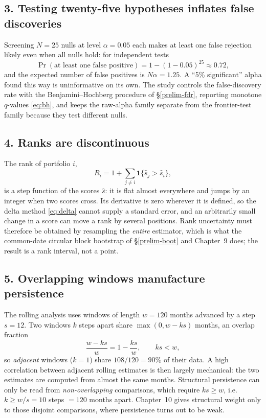 \subsection{3. Testing twenty-five hypotheses inflates false discoveries}

Screening $N=25$ nulls at level $\alpha=0.05$ each makes at least one false
rejection likely even when all nulls hold: for independent tests
\begin{equation}
\Pr(\text{at least one false positive})=1-(1-0.05)^{25}\approx 0.72,
\end{equation}
and the expected number of false positives is $N\alpha=1.25$. A ``5\%
significant'' alpha found this way is uninformative on its own. The study
controls the false-discovery rate with the Benjamini--Hochberg procedure of
\S\ref{prelim-fdr}, reporting monotone $q$-values \eqref{eq:bh}, and keeps
the raw-alpha family separate from the frontier-test family because they
test different nulls.

\subsection{4. Ranks are discontinuous}

The rank of portfolio $i$,
\begin{equation}
R_i=1+\sum_{j\ne i}\mathbf 1\{\hat s_j>\hat s_i\},
\end{equation}
is a step function of the scores $\hat s$: it is flat almost everywhere and
jumps by an integer when two scores cross. Its derivative is zero wherever
it is defined, so the delta method \eqref{eq:delta} cannot supply a
standard error, and an arbitrarily small change in a score can move a rank
by several positions. Rank uncertainty must therefore be obtained by
resampling the \emph{entire} estimator, which is what the common-date
circular block bootstrap of \S\ref{prelim-boot} and Chapter~9 does; the
result is a rank interval, not a point.

\subsection{5. Overlapping windows manufacture persistence}

The rolling analysis uses windows of length $w=120$ months advanced by a
step $s=12$. Two windows $k$ steps apart share $\max(0,w-ks)$ months, an
overlap fraction
\begin{equation}
\frac{w-ks}{w}=1-\frac{ks}{w},\qquad ks<w,
\end{equation}
so \emph{adjacent} windows ($k=1$) share $108/120=90\%$ of their data. A
high correlation between adjacent rolling estimates is then largely
mechanical: the two estimates are computed from almost the same months.
Structural persistence can only be read from \emph{non-overlapping}
comparisons, which require $ks\ge w$, i.e.\ $k\ge w/s=10$ steps $=120$
months apart. Chapter~10 gives structural weight only to those disjoint
comparisons, where persistence turns out to be weak.


